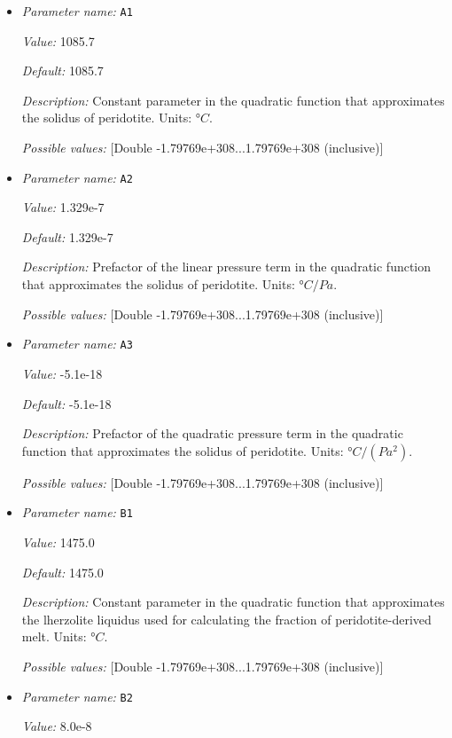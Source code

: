\begin{itemize}
\item {\it Parameter name:} {\tt A1}


{\it Value:} 1085.7


{\it Default:} 1085.7


{\it Description:} Constant parameter in the quadratic function that approximates the solidus of peridotite. Units: $°C$.


{\it Possible values:} [Double -1.79769e+308...1.79769e+308 (inclusive)]
\item {\it Parameter name:} {\tt A2}


{\it Value:} 1.329e-7


{\it Default:} 1.329e-7


{\it Description:} Prefactor of the linear pressure term in the quadratic function that approximates the solidus of peridotite. Units: $°C/Pa$.


{\it Possible values:} [Double -1.79769e+308...1.79769e+308 (inclusive)]
\item {\it Parameter name:} {\tt A3}


{\it Value:} -5.1e-18


{\it Default:} -5.1e-18


{\it Description:} Prefactor of the quadratic pressure term in the quadratic function that approximates the solidus of peridotite. Units: $°C/(Pa^2)$.


{\it Possible values:} [Double -1.79769e+308...1.79769e+308 (inclusive)]
\item {\it Parameter name:} {\tt B1}


{\it Value:} 1475.0


{\it Default:} 1475.0


{\it Description:} Constant parameter in the quadratic function that approximates the lherzolite liquidus used for calculating the fraction of peridotite-derived melt. Units: $°C$.


{\it Possible values:} [Double -1.79769e+308...1.79769e+308 (inclusive)]
\item {\it Parameter name:} {\tt B2}


{\it Value:} 8.0e-8



\end{itemize}
